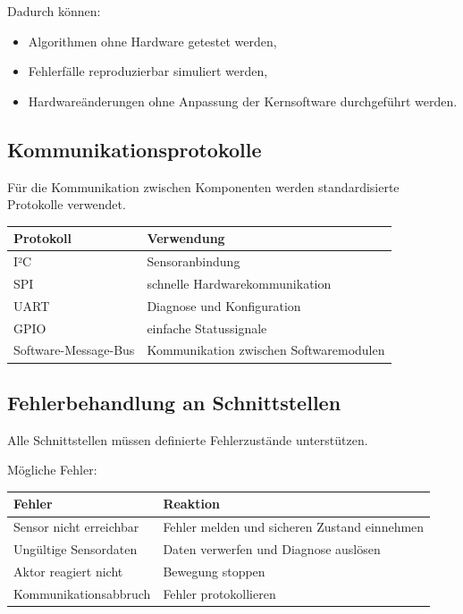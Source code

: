 \documentclass[
  a4paper,
  12pt,
  DIV=12,        %
  parskip=half,  %
  headings=small %
]{scrartcl}
\theoremstyle{definition}
\providecommand{\tightlist}{%
  \setlength{\itemsep}{0pt}\setlength{\parskip}{0pt}}
\theoremstyle{definition}
\begin{document}
Dadurch können:

\begin{itemize}
\tightlist
\item
  Algorithmen ohne Hardware getestet werden,
\item
  Fehlerfälle reproduzierbar simuliert werden,
\item
  Hardwareänderungen ohne Anpassung der Kernsoftware durchgeführt
  werden.
\end{itemize}

\subsection{Kommunikationsprotokolle}\label{kommunikationsprotokolle}

Für die Kommunikation zwischen Komponenten werden standardisierte
Protokolle verwendet.

\begin{longtable}[]{@{}ll@{}}
\toprule\noalign{}
Protokoll & Verwendung \\
\midrule\noalign{}
\endhead
\bottomrule\noalign{}
\endlastfoot
I²C & Sensoranbindung \\
SPI & schnelle Hardwarekommunikation \\
UART & Diagnose und Konfiguration \\
GPIO & einfache Statussignale \\
Software-Message-Bus & Kommunikation zwischen Softwaremodulen \\
\end{longtable}

\subsection{Fehlerbehandlung an
Schnittstellen}\label{fehlerbehandlung-an-schnittstellen}

Alle Schnittstellen müssen definierte Fehlerzustände unterstützen.

Mögliche Fehler:

\begin{longtable}[]{@{}
  >{\raggedright\arraybackslash}p{}
  >{\raggedright\arraybackslash}p{}@{}}
\toprule\noalign{}
\begin{minipage}[b]{\linewidth}\raggedright
Fehler
\end{minipage} & \begin{minipage}[b]{\linewidth}\raggedright
Reaktion
\end{minipage} \\
\midrule\noalign{}
\endhead
\bottomrule\noalign{}
\endlastfoot
Sensor nicht erreichbar & Fehler melden und sicheren Zustand
einnehmen \\
Ungültige Sensordaten & Daten verwerfen und Diagnose auslösen \\
Aktor reagiert nicht & Bewegung stoppen \\
Kommunikationsabbruch & Fehler protokollieren \\
\end{longtable}
\end{document}
